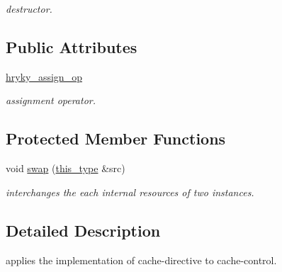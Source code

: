 \begin{DoxyCompactItemize}
\begin{DoxyCompactList}\small\item\em destructor. \end{DoxyCompactList}\end{DoxyCompactItemize}
\subsection*{Public Attributes}
\begin{DoxyCompactItemize}
\item 
\hypertarget{classhryky_1_1http_1_1header_1_1cache_1_1directive_1_1dispatcher_1_1_apply_ae76c684aed3aefd95dd05e18339d3d8f}{\hyperlink{classhryky_1_1http_1_1header_1_1cache_1_1directive_1_1dispatcher_1_1_apply_ae76c684aed3aefd95dd05e18339d3d8f}{hryky\-\_\-assign\-\_\-op}}\label{classhryky_1_1http_1_1header_1_1cache_1_1directive_1_1dispatcher_1_1_apply_ae76c684aed3aefd95dd05e18339d3d8f}

\begin{DoxyCompactList}\small\item\em assignment operator. \end{DoxyCompactList}\end{DoxyCompactItemize}
\subsection*{Protected Member Functions}
\begin{DoxyCompactItemize}
\item 
\hypertarget{classhryky_1_1http_1_1header_1_1cache_1_1directive_1_1dispatcher_1_1_base_ab2b137d16fbe40d839ee136bd5304cab}{void \hyperlink{classhryky_1_1http_1_1header_1_1cache_1_1directive_1_1dispatcher_1_1_base_ab2b137d16fbe40d839ee136bd5304cab}{swap} (\hyperlink{classhryky_1_1http_1_1header_1_1cache_1_1directive_1_1dispatcher_1_1_apply_ae543280f3793accdffa137bcabf76136}{this\-\_\-type} \&src)}\label{classhryky_1_1http_1_1header_1_1cache_1_1directive_1_1dispatcher_1_1_base_ab2b137d16fbe40d839ee136bd5304cab}

\begin{DoxyCompactList}\small\item\em interchanges the each internal resources of two instances. \end{DoxyCompactList}\end{DoxyCompactItemize}


\subsection{Detailed Description}
applies the implementation of cache-\/directive to cache-\/control. 

